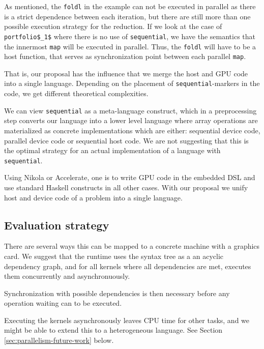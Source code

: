 As mentioned, the \lstinline{foldl} in the example can not be executed
in parallel as there is a strict dependence between each iteration,
but there are still more than one possible execution strategy for the
reduction. If we look at the case of
\lstinline[mathescape]{portfolio$_1$} where there is no use of
\lstinline{sequential}, we have the semantics that the innermost
\lstinline{map} will be executed in parallel. Thus, the
\lstinline{foldl} will have to be a host function, that serves as
synchronization point between each parallel \lstinline{map}.

That is, our proposal has the influence that we merge the host and GPU code
into a single language. Depending on the placement of
\lstinline{sequential}-markers in the code, we get different theoretical
complexities.

We can view \lstinline{sequential} as a meta-language construct, which
in a preprocessing step converts our language into a lower level
language where array operations are materialized as concrete
implementations which are either: sequential device code, parallel
device code or sequential host code. We are not suggesting that this
is the optimal strategy for an actual implementation of a language
with \lstinline{sequential}.

Using Nikola or Accelerate, one is to write GPU code in the embedded
DSL and use standard Haskell constructs in all other cases. With our
proposal we unify host and device code of a problem into a single
language.


\subsection{Evaluation strategy}
There are several ways this can be mapped to a concrete machine with a
graphics card. We suggest that the runtime uses the syntax tree as a
an acyclic dependency graph, and for all kernels where all
dependencies are met, executes them concurrently and asynchronuously.

Synchronization with possible dependencies is then necessary before
any operation waiting can to be executed.

Executing the kernels asynchronously leaves CPU time for other tasks,
and we might be able to extend this to a heterogeneous language. See
Section \ref{sec:parallelism-future-work} below.

